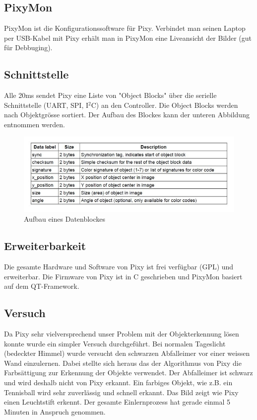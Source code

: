 \subsection{PixyMon}

PixyMon ist die Konfigurationssoftware für Pixy. Verbindet man seinen Laptop per USB-Kabel mit Pixy erhält man in PixyMon eine Liveansicht der Bilder (gut für Debbuging).

\subsection{Schnittstelle}

Alle 20ms sendet Pixy eine Liste von "Object Blocks" über die serielle Schnittstelle (UART, SPI, I$^2$C) an den Controller. Die Object Blocks werden nach Objektgrösse sortiert. Der Aufbau des Blockes kann der unteren Abbildung entnommen werden.

\begin{figure}[h!]
\centering
\includegraphics[width=0.7\linewidth]{../../fig/pixy_schnittstelle}
\caption{Aufbau eines Datenblockes}
\label{fig:pixy_schnittstelle}
\end{figure}

\subsection{Erweiterbarkeit}

Die gesamte Hardware und Software von Pixy ist frei verfügbar (GPL) und erweiterbar. Die Firmware von Pixy ist in C geschrieben und PixyMon basiert auf dem QT-Framework.

\subsection{Versuch}

Da Pixy sehr vielversprechend unser Problem mit der Objekterkennung lösen konnte wurde ein simpler Versuch durchgeführt. Bei normalen Tageslicht (bedeckter Himmel) wurde versucht den schwarzen Abfalleimer vor einer weissen Wand einzulernen. Dabei stellte sich heraus das der Algorithmus von Pixy die Farbsättigung zur Erkennung der Objekte verwendet. Der Abfalleimer ist schwarz und wird deshalb nicht von Pixy erkannt. Ein farbiges Objekt, wie z.B. ein Tennisball wird sehr zuverlässig und schnell erkannt. Das Bild zeigt wie Pixy einen Leuchtstift erkennt. Der gesamte Einlernprozess hat gerade einmal 5 Minuten in Anspruch genommen.

